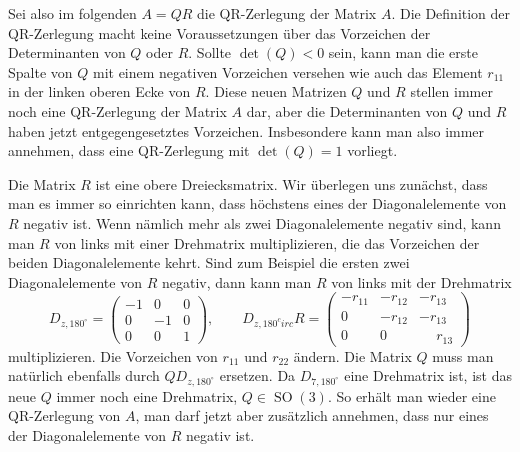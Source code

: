 Sei also im folgenden $A=QR$ die QR-Zerlegung der Matrix $A$.
Die Definition der QR-Zerlegung macht keine Voraussetzungen über das
Vorzeichen der Determinanten von $Q$ oder $R$.
Sollte $\det(Q)<0$ sein, kann man die erste Spalte von $Q$ mit einem
negativen Vorzeichen versehen wie auch das Element $r_{11}$ in der
linken oberen Ecke von $R$.
Diese neuen Matrizen $Q$ und $R$ stellen immer noch eine QR-Zerlegung
der Matrix $A$ dar, aber die Determinanten von $Q$ und $R$ haben jetzt
entgegengesetztes Vorzeichen.
Insbesondere kann man also immer annehmen, dass eine QR-Zerlegung
mit $\det(Q)=1$ vorliegt.

Die Matrix $R$ ist eine obere Dreiecksmatrix.
Wir überlegen uns zunächst, dass man es immer so einrichten kann,
dass höchstens eines der Diagonalelemente von $R$ negativ ist.
Wenn nämlich mehr als zwei Diagonalelemente negativ sind, kann man
$R$ von links mit einer Drehmatrix multiplizieren, die das Vorzeichen
der beiden Diagonalelemente kehrt.
Sind zum Beispiel die ersten zwei Diagonalelemente von $R$ negativ,
dann kann man $R$ von links mit der Drehmatrix
\[
D_{z,180^\circ}
=
\begin{pmatrix}
-1& 0& 0\\
 0&-1& 0\\
 0& 0& 1
\end{pmatrix}
,\qquad
D_{z,180^circ}R
=
\begin{pmatrix}
-r_{11}&-r_{12}&-r_{13}\\
   0   &-r_{12}&-r_{13}\\
   0   &   0   &\phantom{-}r_{13}
\end{pmatrix}
\]
multiplizieren.
Die Vorzeichen von $r_{11}$ und $r_{22}$ ändern.
Die Matrix $Q$ muss man natürlich ebenfalls durch $QD_{z,180^\circ}$
ersetzen.
Da $D_{7,180^\circ}$ eine Drehmatrix ist, ist das neue $Q$ immer noch
eine Drehmatrix, $Q\in\operatorname{SO}(3)$.
So erhält man wieder eine QR-Zerlegung von $A$, man darf jetzt aber
zusätzlich annehmen, dass nur eines der Diagonalelemente von $R$ negativ
ist.

